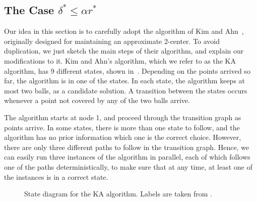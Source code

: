 \documentclass[envcountsame]{cls/cccg15}
\newcommand{\lee}{\leqslant}
\renewcommand{\leq}{\lee}
\begin{document}

\subsection{The Case $\delta^* \leq \alpha r^*$}
\label{subsec:smaller}

Our idea in this section is to carefully adopt
the algorithm of Kim and Ahn~\cite{kim2014improved},
originally designed for maintaining an approximate 2-center.
To avoid duplication, we just sketch the main steps of their algorithm,
and explain our modifications to it. 
Kim and Ahn's algorithm, which we refer to as the KA algorithm,
has 9 different states, shown in~.
Depending on the points arrived so far, the algorithm is in one of the states.
In each state, the algorithm keeps at most two balls, as a candidate solution. 
A transition between the states occurs whenever a point not covered by any of the two balls arrive. 

The algorithm starts at node 1, and proceed through the transition graph as points arrive.
In some states, there is more than one state to follow,
and the algorithm has no prior information which one is the correct choice.
However, there are only three different paths to follow in the transition graph. 
Hence, we can easily run three instances of the algorithm in parallel,
each of which follows one of the paths deterministically, 
to make sure that at any time, at least one of the instances is in a correct state.

\begin{figure}
\centering
{}
\caption{State diagram for the KA algorithm.
Labels are taken from \cite{kim2014improved}.}
\label{fig:dag}
\end{figure}
\end{document}
